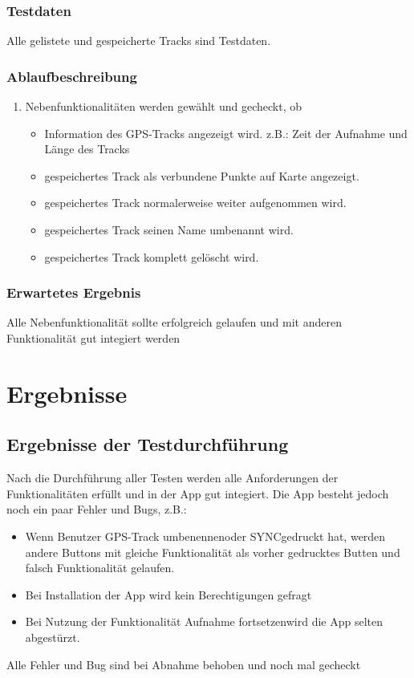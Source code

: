 \documentclass{article}
\begin{document}
\subsubsection{Testdaten}
	Alle gelistete und gespeicherte Tracks sind Testdaten.
\subsubsection{Ablaufbeschreibung}
	\begin{enumerate}
		\item Nebenfunktionalitäten werden gewählt und gecheckt, ob
			\begin{itemize}
				\item Information des GPS-Tracks angezeigt wird. z.B.: Zeit der Aufnahme und Länge des Tracks
				\item gespeichertes Track als verbundene Punkte auf Karte angezeigt.
				\item gespeichertes Track normalerweise weiter aufgenommen wird.
				\item gespeichertes Track seinen Name umbenannt wird.
				\item gespeichertes Track komplett gelöscht wird.
			\end{itemize}
	\end{enumerate}
\subsubsection{Erwartetes Ergebnis}
	Alle Nebenfunktionalität sollte erfolgreich gelaufen und mit anderen Funktionalität gut integiert werden

\section{Ergebnisse}
\subsection{Ergebnisse der Testdurchführung}
	Nach die Durchführung aller Testen werden alle Anforderungen der Funktionalitäten erfüllt und in der App gut integiert. Die App besteht jedoch noch ein paar Fehler und Bugs, z.B.:
	\begin{itemize}
		\item Wenn Benutzer \glqq GPS-Track umbenennen\grqq oder \glqq SYNC\grqq gedruckt hat, werden andere Buttons mit gleiche Funktionalität als vorher gedrucktes Butten und falsch Funktionalität gelaufen.
		\item Bei Installation der App wird kein Berechtigungen gefragt
		\item Bei Nutzung der Funktionalität \glqq Aufnahme fortsetzen\grqq wird die App selten abgestürzt.
	\end{itemize}
	Alle Fehler und Bug sind bei Abnahme behoben und noch mal gecheckt
\end{document}
